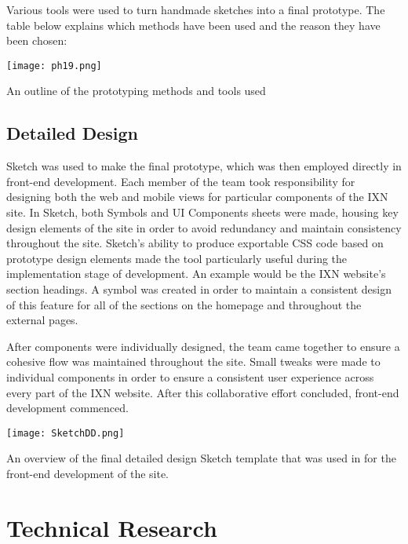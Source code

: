 \documentclass[fontsize=11pt]{extarticle}
\numberwithin{figure}{section} %
\begin{document}
Various tools were used to turn handmade sketches into a final
prototype. The table below explains which methods have been used and the
reason they have been chosen:

\begin{table}[H]
      \centering
      \texttt{[image: ph19.png]}
      \caption{An outline of the prototyping methods and tools used}
 \end{table}

\hypertarget{detailed-design}{%
\subsection{Detailed Design}\label{detailed-design}}

Sketch was used to make the final prototype, which was then employed
directly in front-end development. Each member of the team took
responsibility for designing both the web and mobile views for
particular components of the IXN site. In Sketch, both Symbols and UI
Components sheets were made, housing key design elements of the site in
order to avoid redundancy and maintain consistency throughout the site.
Sketch's ability to produce exportable CSS code based on prototype
design elements made the tool particularly useful during the
implementation stage of development. An example would be the IXN
website's section headings. A symbol was created in order to maintain a
consistent design of this feature for all of the sections on the
homepage and throughout the external pages.

After components were individually designed, the team came together to
ensure a cohesive flow was maintained throughout the site. Small tweaks
were made to individual components in order to ensure a consistent user
experience across every part of the IXN website. After this
collaborative effort concluded, front-end development commenced.

\begin{table}[H]
\centering
\texttt{[image: SketchDD.png]}
\caption{An overview of the final detailed design Sketch template that was used in for the front-end development of the site.}
\label{sketchdd}
\end{table}

\newpage

\hypertarget{technical-research}{%
\section{Technical Research}\label{technical-research}}
\end{document}

